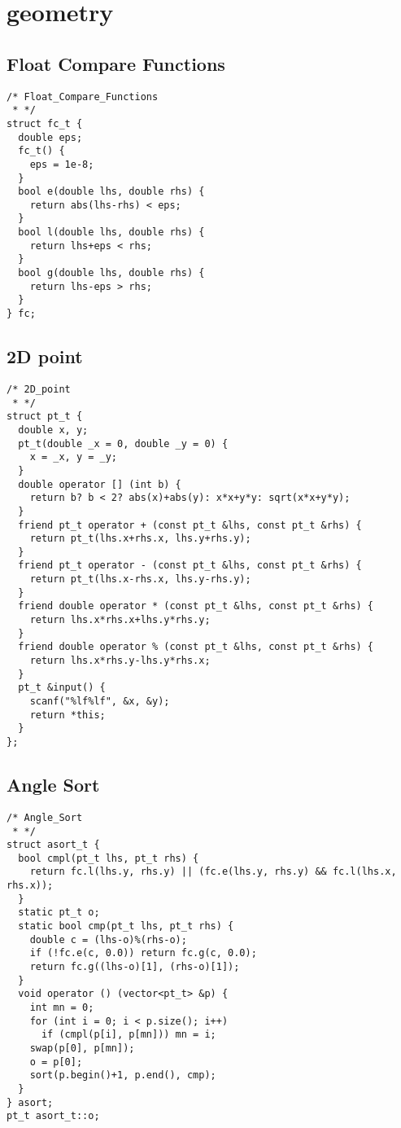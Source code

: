 
\section{geometry}

\subsection{Float Compare Functions}
\begin{lstlisting}
/* Float_Compare_Functions
 * */
struct fc_t {
  double eps;
  fc_t() {
    eps = 1e-8;
  }
  bool e(double lhs, double rhs) {
    return abs(lhs-rhs) < eps;
  }
  bool l(double lhs, double rhs) {
    return lhs+eps < rhs;
  }
  bool g(double lhs, double rhs) {
    return lhs-eps > rhs;
  }
} fc;
\end{lstlisting}


\subsection{2D point}
\begin{lstlisting}
/* 2D_point
 * */
struct pt_t {
  double x, y;
  pt_t(double _x = 0, double _y = 0) {
    x = _x, y = _y;
  }
  double operator [] (int b) {
    return b? b < 2? abs(x)+abs(y): x*x+y*y: sqrt(x*x+y*y);
  }
  friend pt_t operator + (const pt_t &lhs, const pt_t &rhs) {
    return pt_t(lhs.x+rhs.x, lhs.y+rhs.y);
  }
  friend pt_t operator - (const pt_t &lhs, const pt_t &rhs) {
    return pt_t(lhs.x-rhs.x, lhs.y-rhs.y);
  }
  friend double operator * (const pt_t &lhs, const pt_t &rhs) {
    return lhs.x*rhs.x+lhs.y*rhs.y;
  }
  friend double operator % (const pt_t &lhs, const pt_t &rhs) {
    return lhs.x*rhs.y-lhs.y*rhs.x;
  }
  pt_t &input() {
    scanf("%lf%lf", &x, &y);
    return *this;
  }
};
\end{lstlisting}


\subsection{Angle Sort}
\begin{lstlisting}
/* Angle_Sort
 * */
struct asort_t {
  bool cmpl(pt_t lhs, pt_t rhs) {
    return fc.l(lhs.y, rhs.y) || (fc.e(lhs.y, rhs.y) && fc.l(lhs.x, rhs.x));
  }
  static pt_t o;
  static bool cmp(pt_t lhs, pt_t rhs) {
    double c = (lhs-o)%(rhs-o);
    if (!fc.e(c, 0.0)) return fc.g(c, 0.0);
    return fc.g((lhs-o)[1], (rhs-o)[1]);
  }
  void operator () (vector<pt_t> &p) {
    int mn = 0;
    for (int i = 0; i < p.size(); i++)
      if (cmpl(p[i], p[mn])) mn = i;
    swap(p[0], p[mn]);
    o = p[0];
    sort(p.begin()+1, p.end(), cmp);
  }
} asort;
pt_t asort_t::o;
\end{lstlisting}



